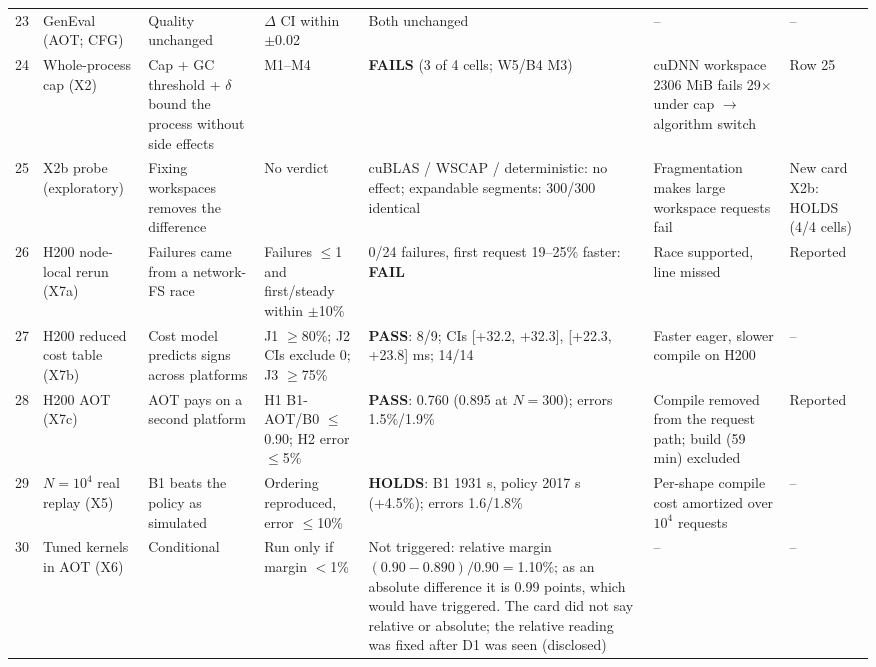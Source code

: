 \documentclass[conference]{IEEEtran}
\newcommand{\tn}[1]{#1}%
\begin{document}
{\begin{longtable}{@{}P{0.4cm}P{2.2cm}P{2.6cm}P{2.6cm}P{3.3cm}P{3.2cm}P{2.2cm}@{}}
23 & GenEval (AOT; CFG) & Quality unchanged & $\Delta$ CI within $\pm$0.02 & Both unchanged & -- & --\\
24 & Whole-process cap (X2) & Cap + GC threshold + $\delta$ bound the process without side effects & M1--M4 & \textbf{FAILS} (3 of 4 cells; W5/B4 M3) & cuDNN workspace \tn{2306 MiB} fails \tn{29}$\times$ under cap $\to$ algorithm switch & Row 25\\
25 & X2b probe (exploratory) & Fixing workspaces removes the difference & No verdict & cuBLAS / WSCAP / deterministic: no effect; expandable segments: \tn{300/300} identical & Fragmentation makes large workspace requests fail & New card X2b: HOLDS (4/4 cells)\\
26 & H200 node-local rerun (X7a) & Failures came from a network-FS race & Failures $\le$1 and first/steady within $\pm$10\% & 0/24 failures, first request \tn{19--25\%} faster: \textbf{FAIL} & Race supported, line missed & Reported\\
27 & H200 reduced cost table (X7b) & Cost model predicts signs across platforms & J1 $\ge$80\%; J2 CIs exclude 0; J3 $\ge$75\% & \textbf{PASS}: \tn{8/9}; CIs [\tn{+32.2}, \tn{+32.3}], [\tn{+22.3}, \tn{+23.8}] ms; \tn{14/14} & Faster eager, slower compile on H200 & --\\
28 & H200 AOT (X7c) & AOT pays on a second platform & H1 B1-AOT/B0 $\le$0.90; H2 error $\le$5\% & \textbf{PASS}: \tn{0.760} (\tn{0.895} at $N{=}300$); errors \tn{1.5\%}/\tn{1.9\%} & Compile removed from the request path; build (\tn{59 min}) excluded & Reported\\
29 & $N{=}10^4$ real replay (X5) & B1 beats the policy as simulated & Ordering reproduced, error $\le$10\% & \textbf{HOLDS}: B1 \tn{1931 s}, policy \tn{2017 s} (+\tn{4.5\%}); errors \tn{1.6/1.8\%} & Per-shape compile cost amortized over $10^4$ requests & --\\
30 & Tuned kernels in AOT (X6) & Conditional & Run only if margin $<$1\% & Not triggered: relative margin $(0.90{-}0.890)/0.90{=}$\tn{1.10\%}; as an absolute difference it is \tn{0.99} points, which would have triggered. The card did not say relative or absolute; the relative reading was fixed after D1 was seen (disclosed) & -- & --\\

\end{longtable}}
\end{document}
